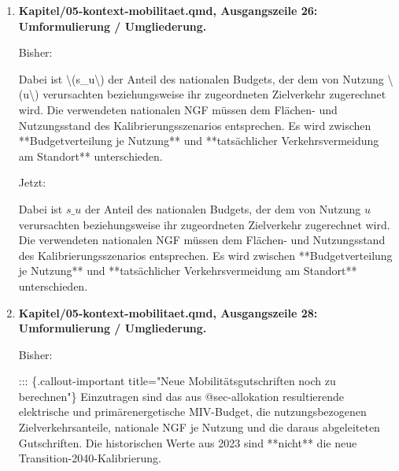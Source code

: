 \documentclass[
  ngerman,
  a4paper,
  DIV=11]{scrreprt}
\newenvironment{Shaded}{\begin{snugshade}}{\end{snugshade}}
\newcommand{\NormalTok}[1]{\textcolor[rgb]{0.00,0.23,0.31}{#1}}
\begin{document}
\begin{enumerate}
  Bisher:

\begin{Shaded}
\begin{Highlighting}[]
\NormalTok{Für Nutzung \textbackslash{}(u\textbackslash{}) gilt:}
\end{Highlighting}
\end{Shaded}

  Jetzt:

\begin{Shaded}
\begin{Highlighting}[]
\NormalTok{Für Nutzung $u$ gilt:}
\end{Highlighting}
\end{Shaded}
\item
  \textbf{Kapitel/05-kontext-mobilitaet.qmd, Ausgangszeile 26:
  Umformulierung / Umgliederung.}

  Bisher:

\begin{Shaded}
\begin{Highlighting}[]
\NormalTok{Dabei ist \textbackslash{}(s\_u\textbackslash{}) der Anteil des nationalen Budgets, der dem von Nutzung \textbackslash{}(u\textbackslash{}) verursachten beziehungsweise ihr zugeordneten Zielverkehr zugerechnet wird. Die verwendeten nationalen NGF müssen dem Flächen{-} und Nutzungsstand des Kalibrierungsszenarios entsprechen. Es wird zwischen **Budgetverteilung je Nutzung** und **tatsächlicher Verkehrsvermeidung am Standort** unterschieden.}
\end{Highlighting}
\end{Shaded}

  Jetzt:

\begin{Shaded}
\begin{Highlighting}[]
\NormalTok{Dabei ist $s\_u$ der Anteil des nationalen Budgets, der dem von Nutzung $u$ verursachten beziehungsweise ihr zugeordneten Zielverkehr zugerechnet wird. Die verwendeten nationalen NGF müssen dem Flächen{-} und Nutzungsstand des Kalibrierungsszenarios entsprechen. Es wird zwischen **Budgetverteilung je Nutzung** und **tatsächlicher Verkehrsvermeidung am Standort** unterschieden.}
\end{Highlighting}
\end{Shaded}
\item
  \textbf{Kapitel/05-kontext-mobilitaet.qmd, Ausgangszeile 28:
  Umformulierung / Umgliederung.}

  Bisher:

\begin{Shaded}
\begin{Highlighting}[]
\NormalTok{::: \{.callout{-}important title="Neue Mobilitätsgutschriften noch zu berechnen"\}}
\NormalTok{Einzutragen sind das aus @sec{-}allokation resultierende elektrische und primärenergetische MIV{-}Budget, die nutzungsbezogenen Zielverkehrsanteile, nationale NGF je Nutzung und die daraus abgeleiteten Gutschriften. Die historischen Werte aus 2023 sind **nicht** die neue Transition{-}2040{-}Kalibrierung.}
\end{Highlighting}
\end{Shaded}


\end{enumerate}
\end{document}
